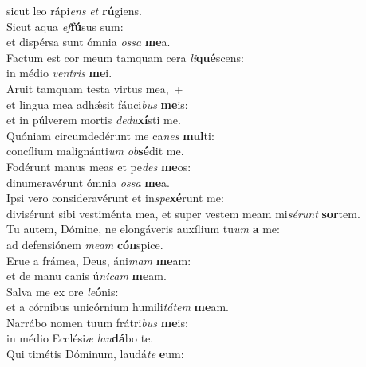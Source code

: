 \oddverse sicut leo rápi\textit{ens} \textit{et} \textbf{rú}giens.\\
\evenverse Sicut aqua \textit{ef}\textbf{fú}sus sum:~\*\\
\evenverse et dispérsa sunt ómnia \textit{os}\textit{sa} \textbf{me}a.\\
\oddverse Factum est cor meum tamquam cera \textit{li}\textbf{qué}scens:~\*\\
\oddverse in médio \textit{ven}\textit{tris} \textbf{me}i.\\
\evenverse Aruit tamquam testa virtus mea,~+\\
\evenverse  et lingua mea adhǽsit fáuci\textit{bus} \textbf{me}is:~\*\\
\evenverse et in púlverem mortis \textit{de}\textit{du}\textbf{xí}sti me.\\
\oddverse Quóniam circumdedérunt me ca\textit{nes} \textbf{mul}ti:~\*\\
\oddverse concílium malignánti\textit{um} \textit{ob}\textbf{sé}dit me.\\
\evenverse Fodérunt manus meas et pe\textit{des} \textbf{me}os:~\*\\
\evenverse dinumeravérunt ómnia \textit{os}\textit{sa} \textbf{me}a.\\
\oddverse Ipsi vero consideravérunt et in\textit{spe}\textbf{xé}runt me:~\*\\
\oddverse divisérunt sibi vestiménta mea, et super vestem meam mi\textit{sé}\textit{runt} \textbf{sor}tem.\\
\evenverse Tu autem, Dómine, ne elongáveris auxílium tu\textit{um} \textbf{a} me:~\*\\
\evenverse ad defensiónem \textit{me}\textit{am} \textbf{cón}spice.\\
\oddverse Erue a frámea, Deus, áni\textit{mam} \textbf{me}am:~\*\\
\oddverse et de manu canis ú\textit{ni}\textit{cam} \textbf{me}am.\\
\evenverse Salva me ex ore \textit{le}\textbf{ó}nis:~\*\\
\evenverse et a córnibus unicórnium humili\textit{tá}\textit{tem} \textbf{me}am.\\
\oddverse Narrábo nomen tuum frátri\textit{bus} \textbf{me}is:~\*\\
\oddverse in médio Ecclési\textit{æ} \textit{lau}\textbf{dá}bo te.\\
\evenverse Qui timétis Dóminum, laudá\textit{te} \textbf{e}um:~\*\\
